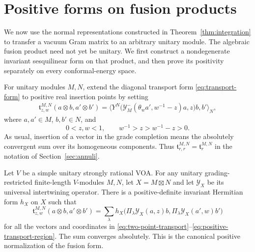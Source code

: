\section{Positive forms on fusion products}
\label{sec:fusion}

We now use the normal representations constructed in
Theorem~\ref{thm:integration} to transfer a vacuum Gram matrix to an
arbitrary unitary module.  The algebraic fusion product need not yet be
unitary.  We first construct a nondegenerate invariant sesquilinear form
on that product, and then prove its positivity separately on every
conformal-energy space.

For unitary modules $M,N$, extend the diagonal transport form
\eqref{eq:transport-form} to positive real insertion points by setting
\begin{equation}
\begin{split}
 \mathfrak t^{M,N}_{z,w}(a\otimes b,a'\otimes b')
 =\big\langle
 Y^N\big(\mathcal Y_M^-(\theta_w a',w^{-1}-z)a,z\big)b,b'
 \big\rangle_N,
\end{split}
\label{eq:two-point-transport}
\end{equation}
where $a,a'\in M$, $b,b'\in N$, and
\begin{equation}
 0<z,w<1,\qquad w^{-1}>z>w^{-1}-z>0.
 \label{eq:positive-transport-region}
\end{equation}
As usual, insertion of a vector in the grade completion means the
absolutely convergent sum over its homogeneous components.  Thus
$\mathfrak t^{M,N}_{r,r}=\mathfrak t^{M,N}_r$ in the notation of
Section~\ref{sec:annuli}.

\begin{theorem}
\label{thm:positive-fusion}
Let $V$ be a simple unitary strongly rational VOA.  For any unitary
grading-restricted finite-length $V$-modules $M,N$, let
$X=M\boxtimes N$ and let $\mathcal Y_X$ be its universal intertwining
operator.  There is a positive-definite invariant Hermitian form $h_X$
on $X$ such that
\begin{equation}
 \mathfrak t^{M,N}_{z,w}(a\otimes b,a'\otimes b')
 =\sum_\lambda h_X\big(
 \Pi_\lambda\mathcal Y_X(a,z)b,
 \Pi_\lambda\mathcal Y_X(a',w)b'\big)
 \label{eq:positive-fusion-identity}
\end{equation}
for all the vectors and coordinates in
\eqref{eq:two-point-transport}--\eqref{eq:positive-transport-region}.
The sum converges absolutely.  This is the canonical positive
normalization of the fusion form.
\end{theorem}

